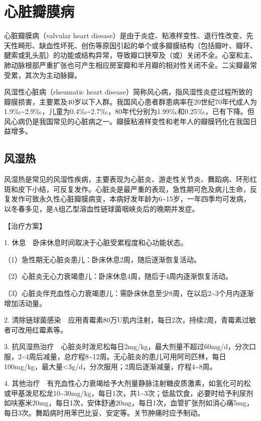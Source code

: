 \section{心脏瓣膜病}

心脏瓣膜病（valvular heart
disease）是由于炎症、粘液样变性、退行性改变、先天性畸形、缺血性坏死、创伤等原因引起的单个或多瓣膜结构（包括瓣叶、瓣环、腱索或乳头肌）的功能或结构异常，导致瓣口狭窄及（或）关闭不全。心室和主、肺动脉根部严重扩张也可产生相应房室瓣和半月瓣的相对性关闭不全。二尖瓣最常受累，其次为主动脉瓣。

风湿性心脏病（rheumatic heart
disease）简称风心病，指风湿性炎症过程所致的瓣膜损害，主要累及40岁以下人群。我国风心患者群患病率在20世纪70年代成人为1.9‰\textasciitilde{}2.9‰，儿童为0.4‰\textasciitilde{}2.7‰，80年代分别为1.99‰和0.25‰，已有下降。但风心病仍是我国常见的心脏病之一。瓣膜粘液样变性和老年人的瓣膜钙化在我国日益增多。

\subsection{风湿热}

风湿热是常见的风湿性疾病，主要表现为心脏炎、游走性关节炎、舞蹈病、环形红斑和皮下小结，可反复发作。心脏炎是最严重的表现，急性期可危及病儿生命，反复发作可致永久性心脏瓣膜病变，本病好发年龄为6\textasciitilde{}15岁，一年四季均可发病，以冬春多见，是A组乙型溶血性链球菌咽峡炎后的晚期并发症。

【治疗方案】

1. 休息　卧床休息时间取决于心脏受累程度和心功能状态。

（1）急性期无心脏炎患儿：卧床休息2周，随后逐渐恢复活动。

（2）心脏炎无心力衰竭患儿：卧床休息4周，随后于4周内逐渐恢复活动。

（3）心脏炎伴充血性心力衰竭患儿：需卧床休息至少8周，在以后2\textasciitilde{}3个月内逐渐增加活动量。

2.
清除链球菌感染　应用青霉素80万U肌内注射，每日2次，持续2周，青霉素过敏者可改用红霉素等。

3.
抗风湿热治疗　心脏炎时泼尼松每日2mg/kg，最大剂量不超过60mg/d，分次口服，2\textasciitilde{}4周后减量，总疗程8\textasciitilde{}12周。无心脏炎的患儿可用阿司匹林，每日100mg/kg，最大量\textless{}3g/d，分次服用；2周后逐渐减量，疗程4\textasciitilde{}8周。

4.
其他治疗　有充血性心力衰竭给予大剂量静脉注射糖皮质激素，如氢化可的松或甲基泼尼松龙10\textasciitilde{}30mg/kg，每日1次，共1\textasciitilde{}3次；低盐饮食，必要时给予利尿剂如呋塞米20mg，每日1次，安体舒通20mg，每日1次，血管扩张剂如消心痛5mg，每日3次。舞蹈病时用苯巴比妥、安定等。关节肿痛时应予制动。

